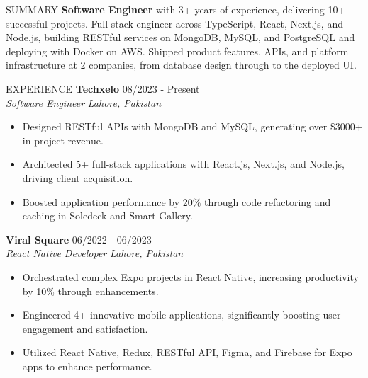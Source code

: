\documentclass{resume}
\begin{document}
\begin{rSection}{SUMMARY}
\textbf{Software Engineer} with 3+ years of experience, delivering 10+ successful projects. Full-stack engineer across TypeScript, React, Next.js, and Node.js, building RESTful services on MongoDB, MySQL, and PostgreSQL and deploying with Docker on AWS. Shipped product features, APIs, and platform infrastructure at 2 companies, from database design through to the deployed UI.
\end{rSection}
\begin{rSection}{EXPERIENCE}
\textbf{Techxelo} \hfill 08/2023 - Present \\
\textit{Software Engineer}  \hfill \textit{Lahore, Pakistan}
\begin{itemize}
\itemsep -3pt {}
\item Designed RESTful APIs with MongoDB and MySQL, generating over \$3000+ in project revenue.
\item Architected 5+ full-stack applications with React.js, Next.js, and Node.js, driving client acquisition.
\item Boosted application performance by 20\% through code refactoring and caching in Soledeck and Smart Gallery.
\end{itemize}
\textbf{Viral Square} \hfill 06/2022 - 06/2023 \\
\textit{React Native Developer} \hfill \textit{Lahore, Pakistan}
\begin{itemize}
\itemsep -3pt {}
\item Orchestrated complex Expo projects in React Native, increasing productivity by 10\% through enhancements.
\item Engineered 4+ innovative mobile applications, significantly boosting user engagement and satisfaction.
\item Utilized React Native, Redux, RESTful API, Figma, and Firebase for Expo apps to enhance performance.
\end{itemize}
\end{rSection}
\end{document}
